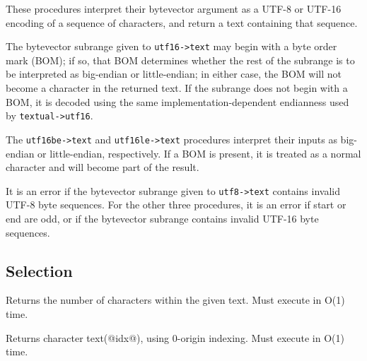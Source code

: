 \begin{entry}{%
  }

  These
  procedures interpret their bytevector argument as a UTF-8 or UTF-16
  encoding of a sequence of characters, and return a text containing
  that sequence.

  The bytevector subrange given to \texttt{utf16->text} may begin with
  a byte order mark (BOM); if so, that BOM determines whether the rest
  of the subrange is to be interpreted as big-endian or little-endian;
  in either case, the BOM will not become a character in the returned
  text. If the subrange does not begin with a BOM, it is decoded using
  the same implementation-dependent endianness used by
  \texttt{textual->utf16}.

  The \texttt{utf16be->text} and \texttt{utf16le->text} procedures
  interpret their inputs as big-endian or little-endian,
  respectively. If a BOM is present, it is treated as a normal
  character and will become part of the result.

  It is an error if the bytevector subrange given to
  \texttt{utf8->text} contains invalid UTF-8 byte sequences.  For the
  other three procedures, it is an error if start or end are odd, or
  if the bytevector subrange contains invalid UTF-16 byte sequences.
\end{entry}

\subsection{{Selection}}\label{selection}

\begin{entry}{%
  }

  Returns the number of
  characters within the given text. Must execute in O(1) time.
\end{entry}

\begin{entry}{%
  }

  Returns character
  text(@idx@), using 0-origin indexing. Must execute in O(1) time.
\end{entry}

